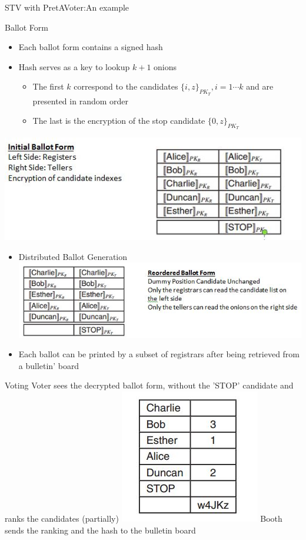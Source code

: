 \documentclass{beamer}
\begin{document}
\begin{frame}[allowframebreaks]{STV with PretAVoter:An example}

\begin{block}{Ballot Form}
\begin{itemize}
\item Each ballot form contains a signed hash
\item Hash serves as a key to lookup $k+1$ onions
\begin{itemize}
\item The first $k$ correspond to the candidates $\{ i, z \}_{PK_{T}}, i=1 \cdots k$ and are presented in random order
\item The last is the encryption of the stop candidate  $\{ 0, z \}_{PK_{T}}$
\end{itemize}
\end{itemize}
\end{block}
\includegraphics[scale=0.5]{stv1.jpg}


\begin{itemize}
\item Distributed Ballot Generation
\includegraphics[scale=0.5]{stv2.jpg}
\item Each ballot can be printed by a subset of registrars after being retrieved from a bulletin' board
\end{itemize}

\begin{block}{Voting}
Voter sees the decrypted ballot form, without the 'STOP' candidate and ranks the candidates (partially)
\includegraphics[scale=0.5]{stv3.jpg}
Booth sends the ranking and the hash to the bulletin board
\end{block}


\end{frame}
\end{document}

